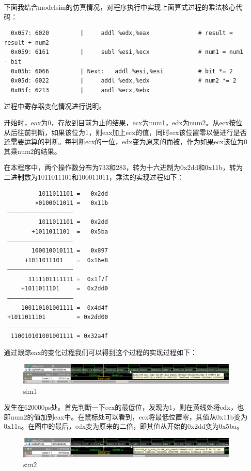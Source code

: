 \documentclass[12pt]{article}
\begin{document}
\begin{CJK*}{GB}{gbsn}
下面我结合modelsim的仿真情况，对程序执行中实现上面算式过程的乘法核心代码：

\begin{verbatim}
  0x057: 6020         |     addl %edx,%eax              # result = result + num2
  0x059: 6161         |     subl %esi,%ecx              # num1 = num1 - bit
  0x05b: 6066         | Next:   addl %esi,%esi          # bit *= 2
  0x05d: 6022         |     addl %edx,%edx              # num2 *= 2
  0x05f: 6213         |     andl %ecx,%ebx
\end{verbatim}

过程中寄存器变化情况进行说明。

开始时，eax为0，存放到目前为止的结果，ecx为num1，edx为num2。从ecx按位从后往前判断，如果该位为1，则eax加上ecx的值，同时ecx该位置零以便进行是否还需要运算的判断。每判断ecx的一位，edx变为原来的而被，作为如果ecx该位为0其乘num2的结果。

在本程序中，两个操作数分布为733和283，转为十六进制为0x2dd和0x11b，转为二进制数为1011011101和100011011，乘法的实现过程如下：

\begin{verbatim}
          1011011101 =   0x2dd
         ×0100011011 =   0x11b
 ———————————————————
          1011011101 =   0x2dd
        +1011011101  =   0x5ba
 ———————————————————
        100010010111 =   0x897
      +1011011101    =  0x16e8
 ———————————————————
       1111101111111 =  0x1f7f
     +1011011101     =  0x2dd0
 ———————————————————
     100110101001111 =  0x4d4f
 +1011011101         = 0x2dd00
 ———————————————————
  110010101001001111 = 0x32a4f
\end{verbatim}

通过跟踪eax的变化过程我们可以得到这个过程的实现过程如下：

\begin{figure}[htbp]
\centering
\includegraphics{img/sim1.png}
\caption{sim1}
\end{figure}

发生在620000ps处。首先判断一下ecx的最低位，发现为1，则在黄线处将edx，也即num2的值加到eax中。在鼠标处可以看到，ecx将最低位置零，其值从0x11b变为0x11a。在图中的最后，edx变为原来的二倍，即其值从开始的0x2dd变为0x5ba。

\begin{figure}[htbp]
\centering
\includegraphics{img/sim2.png}
\caption{sim2}
\end{figure}


\end{CJK*}
\end{document}

